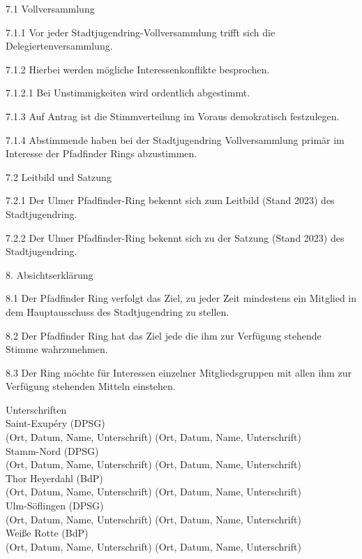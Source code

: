 7.1 Vollversammlung

7.1.1 Vor jeder Stadtjugendring-Vollversammlung trifft sich die
Delegiertenversammlung.

7.1.2 Hierbei werden mögliche Interessenkonflikte besprochen.

7.1.2.1 Bei Unstimmigkeiten wird ordentlich abgestimmt.

7.1.3 Auf Antrag ist die Stimmverteilung im Voraus demokratisch festzulegen.

7.1.4 Abstimmende haben bei der Stadtjugendring Vollversammlung primär im Interesse der Pfadfinder Rings abzustimmen.

7.2 Leitbild und Satzung

7.2.1 Der Ulmer Pfadfinder-Ring bekennt sich zum Leitbild (Stand 2023) des Stadtjugendring.

7.2.2 Der Ulmer Pfadfinder-Ring bekennt sich zu der Satzung (Stand 2023) des Stadtjugendring.

8. Absichtserklärung

8.1 Der Pfadfinder Ring verfolgt das Ziel, zu jeder Zeit mindestens ein Mitglied in dem Hauptausschuss des Stadtjugendring zu stellen.

8.2 Der Pfadfinder Ring hat das Ziel jede die ihm zur Verfügung stehende Stimme wahrzunehmen.

8.3 Der Ring möchte für Interessen einzelner Mitgliedsgruppen mit allen ihm zur Verfügung stehenden Mitteln einstehen.

\newpage

Unterschriften
\\

Saint-Exupéry (DPSG)
\\
(Ort, Datum, Name, Unterschrift) (Ort, Datum, Name, Unterschrift)
\\

Stamm-Nord (DPSG)
\\
(Ort, Datum, Name, Unterschrift) (Ort, Datum, Name, Unterschrift)
\\

Thor Heyerdahl (BdP)
\\
(Ort, Datum, Name, Unterschrift) (Ort, Datum, Name, Unterschrift)
\\

Ulm-Söflingen (DPSG)
\\
(Ort, Datum, Name, Unterschrift) (Ort, Datum, Name, Unterschrift)
\\

Weiße Rotte (BdP)
\\
(Ort, Datum, Name, Unterschrift) (Ort, Datum, Name, Unterschrift)
